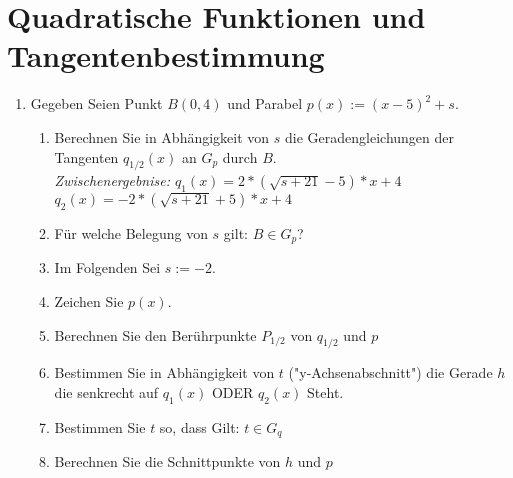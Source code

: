 \documentclass{scrartcl}
\begin{document}
	\section{Quadratische Funktionen und Tangentenbestimmung}
		
	\begin{enumerate}
		
		
		\item Gegeben Seien Punkt $B(0,4)$ und Parabel $p(x):=(x-5)^2+s$.
		\begin{enumerate}
			\item Berechnen Sie in Abhängigkeit von $s$ die Geradengleichungen der Tangenten $q_{1/2}(x)$ an $G_p$ durch $B$. \\
				\emph{Zwischenergebnise: $q_1(x) = 2 * (\sqrt{s+21}-5 )*x+4$ \quad $q_2(x) = -2 * (\sqrt{s+21}+5 )*x+4$}
			\item Für welche Belegung von $s$ gilt: $B\in G_p $? 
			\item Im Folgenden Sei $s:=-2$.
			\item Zeichen Sie $p(x)$.

			\item Berechnen Sie den Berührpunkte $P_{1/2}$ von $q_{1/2}$ und $p$
			\item Bestimmen Sie in Abhängigkeit von $t$ ("y-Achsenabschnitt") die Gerade $h$ die senkrecht auf $q_1(x)$ ODER $q_2(x)$ Steht.
			\item Bestimmen Sie $t$ so, dass Gilt: $t \in G_q$
			\item Berechnen Sie die Schnittpunkte von $h$ und $p$ \\
		\end{enumerate} %
		
		
		
	\end{enumerate} 
	
	
\end{document}
